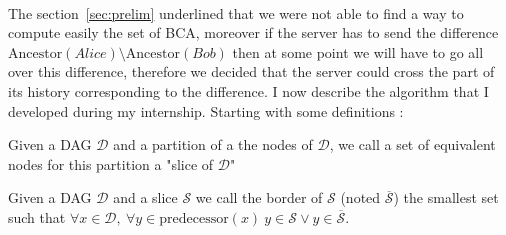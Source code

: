 \paragraph{} The section~\ref{sec:prelim} underlined that we were not able to find a way to compute easily the set of BCA, moreover if the server has to send the difference $\mathrm{Ancestor}(Alice) \setminus \mathrm{Ancestor}(Bob)$ then at some point we will have to go all over this difference, therefore we decided that the server could cross the part of its history corresponding to the difference. I now describe the algorithm that I developed during my internship. Starting with some definitions : 
\begin{definition}
 Given a DAG $\mathcal{D}$ and a partition of a the nodes of $\mathcal{D}$, we call a set of equivalent nodes for this partition a "slice of $\mathcal{D}$"
\end{definition}
\begin{definition}
 Given a DAG $\mathcal{D}$ and a slice $\mathcal{S}$ we call the border of $\mathcal{S}$ (noted $\overline{\mathcal S}$) the smallest set such that $\forall x \in \mathcal{D},\ \forall y\in \mathrm{predecessor}(x)\  y\in \mathcal{S} \vee y \in \overline{\mathcal S}$.
\end{definition}
